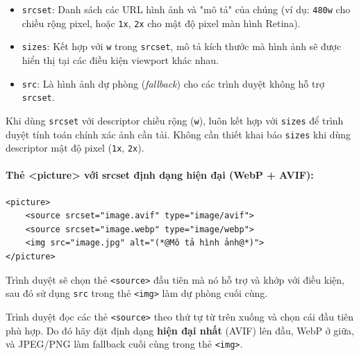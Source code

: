 \documentclass[11pt,oneside]{book}
\newcommand{\codeinline}[1]{\textcolor{accentOrange}{\texttt{#1}}}
\begin{document}
\begin{itemize}[leftmargin=1.5em, itemsep=3pt, parsep=0pt]
    \item \codeinline{srcset}: Danh sách các URL hình ảnh và "mô tả" của chúng (ví dụ: \codeinline{480w} cho chiều rộng pixel, hoặc \codeinline{1x}, \codeinline{2x} cho mật độ pixel màn hình Retina).
    \item \codeinline{sizes}: Kết hợp với \codeinline{w} trong \codeinline{srcset}, mô tả kích thước mà hình ảnh sẽ được hiển thị tại các điều kiện viewport khác nhau.
    \item \codeinline{src}: Là hình ảnh dự phòng (\textit{fallback}) cho các trình duyệt không hỗ trợ \codeinline{srcset}.
\end{itemize}

\begin{tipBox}
Khi dùng \codeinline{srcset} với descriptor chiều rộng (\codeinline{w}), luôn kết hợp với \codeinline{sizes} để trình duyệt tính toán chính xác ảnh cần tải. Không cần thiết khai báo \codeinline{sizes} khi dùng descriptor mật độ pixel (\codeinline{1x}, \codeinline{2x}).
\end{tipBox}

\paragraph{Thẻ <picture> với srcset định dạng hiện đại (WebP + AVIF):}

\begin{codeWindow}
\begin{lstlisting}[language=HTML5]
<picture>
    <source srcset="image.avif" type="image/avif">
    <source srcset="image.webp" type="image/webp">
    <img src="image.jpg" alt="(*@Mô tả hình ảnh@*)">
</picture>
\end{lstlisting}
\end{codeWindow}

Trình duyệt sẽ chọn thẻ \codeinline{<source>} đầu tiên mà nó hỗ trợ và khớp với điều kiện, sau đó sử dụng \codeinline{src} trong thẻ \codeinline{<img>} làm dự phòng cuối cùng.

\begin{noteBox}
Trình duyệt đọc các thẻ \codeinline{<source>} theo thứ tự từ trên xuống và chọn cái đầu tiên phù hợp. Do đó hãy đặt định dạng \textbf{hiện đại nhất} (AVIF) lên đầu, WebP ở giữa, và JPEG/PNG làm fallback cuối cùng trong thẻ \codeinline{<img>}.
\end{noteBox}
\end{document}
